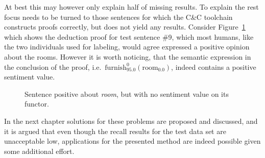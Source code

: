 At best this may however only explain half of missing results. To explain the rest focus needs to be turned to those sentences for which the C\&C toolchain constructs proofs correctly, but does not yield any results. Consider Figure~\ref{fig:verbSentiment} which shows the deduction proof for test sentence \#9, which most humans, like the two individuals used for labeling, would agree expressed a positive opinion about the rooms. However it is worth noticing, that the semantic expression in the conclusion of the proof, i.e.\ $\mathrm{furnish}_{95.0}^{0}(\mathrm{room}_{0.0})$, indeed contains a positive sentiment value. 

\begin{figure}[ht]
\begin{center}
\end{center}
\caption{Sentence positive about \emph{room}, but with no sentiment value on its functor.}
\label{fig:verbSentiment}
\end{figure}

In the next chapter solutions for these problems are proposed and discussed, and it is argued that even though the recall results for the test data set are unacceptable low, applications for the presented method are indeed possible given some additional effort.